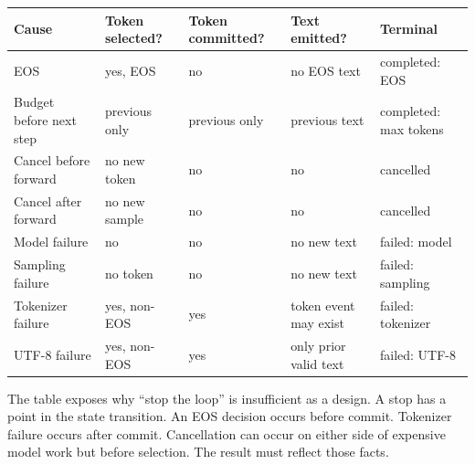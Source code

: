 {\def\LTcaptype{none} %
\begin{longtable}[]{@{}
  >{\raggedright\arraybackslash}p{}
  >{\raggedright\arraybackslash}p{}
  >{\raggedright\arraybackslash}p{}
  >{\raggedright\arraybackslash}p{}
  >{\raggedright\arraybackslash}p{}@{}}
\toprule\noalign{}
\begin{minipage}[b]{\linewidth}\raggedright
Cause
\end{minipage} & \begin{minipage}[b]{\linewidth}\raggedright
Token selected?
\end{minipage} & \begin{minipage}[b]{\linewidth}\raggedright
Token committed?
\end{minipage} & \begin{minipage}[b]{\linewidth}\raggedright
Text emitted?
\end{minipage} & \begin{minipage}[b]{\linewidth}\raggedright
Terminal
\end{minipage} \\
\midrule\noalign{}
\endhead
\bottomrule\noalign{}
\endlastfoot
EOS & yes, EOS & no & no EOS text & completed: EOS \\
Budget before next step & previous only & previous only & previous text
& completed: max tokens \\
Cancel before forward & no new token & no & no & cancelled \\
Cancel after forward & no new sample & no & no & cancelled \\
Model failure & no & no & no new text & failed: model \\
Sampling failure & no token & no & no new text & failed: sampling \\
Tokenizer failure & yes, non-EOS & yes & token event may exist & failed:
tokenizer \\
UTF-8 failure & yes, non-EOS & yes & only prior valid text & failed:
UTF-8 \\
\end{longtable}
}

The table exposes why ``stop the loop'' is insufficient as a design. A
stop has a point in the state transition. An EOS decision occurs before
commit. Tokenizer failure occurs after commit. Cancellation can occur on
either side of expensive model work but before selection. The result
must reflect those facts.

